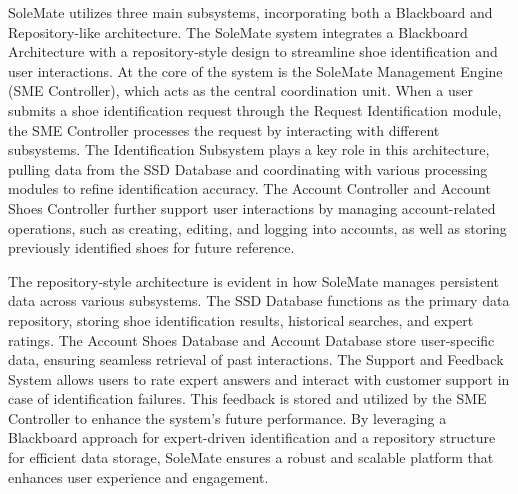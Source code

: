 \documentclass[]{article}
\begin{document}
SoleMate utilizes three main subsystems, incorporating both a Blackboard and Repository-like architecture. The SoleMate system integrates a Blackboard Architecture with a repository-style design to streamline shoe identification and user interactions. At the core of the system is the SoleMate Management Engine (SME Controller), which acts as the central coordination unit. When a user submits a shoe identification request through the Request Identification module, the SME Controller processes the request by interacting with different subsystems. The Identification Subsystem plays a key role in this architecture, pulling data from the SSD Database and coordinating with various processing modules to refine identification accuracy. The Account Controller and Account Shoes Controller further support user interactions by managing account-related operations, such as creating, editing, and logging into accounts, as well as storing previously identified shoes for future reference.\par
The repository-style architecture is evident in how SoleMate manages persistent data across various subsystems. The SSD Database functions as the primary data repository, storing shoe identification results, historical searches, and expert ratings. The Account Shoes Database and Account Database store user-specific data, ensuring seamless retrieval of past interactions. The Support and Feedback System allows users to rate expert answers and interact with customer support in case of identification failures. This feedback is stored and utilized by the SME Controller to enhance the system’s future performance. By leveraging a Blackboard approach for expert-driven identification and a repository structure for efficient data storage, SoleMate ensures a robust and scalable platform that enhances user experience and engagement.


	
\end{document}
